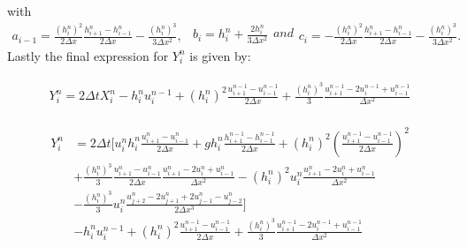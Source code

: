 \documentclass[12pt]{article}
\begin{document}
with
\begin{subequations}
	\begin{gather}
	a_{i-1} = \frac{\left(h^n_i\right)^2}{2\Delta x}\frac{h^n_{i+1} - h^n_{i-1}}{2\Delta x} - \frac{\left(h^n_i\right)^3}{3 \Delta x^2}  ,
	\label{eq:utriAa}
	\end{gather}
	\begin{gather}
	b_i = h^n_i + \frac{2 h^n_i}{3 \Delta x^2}
	\label{eq:utriAb}
	\end{gather}
	and
	\begin{gather}
	c_i = -\frac{\left(h^n_i\right)^2}{2\Delta x}\frac{h^n_{i+1} - h^n_{i-1}}{2\Delta x} - \frac{\left(h^n_i\right)^3}{3 \Delta x^2}.
	\label{eq:utriAc}
	\end{gather}
\end{subequations}
Lastly the final expression for $Y^n_i$ is given by:

	\begin{gather}
	\begin{split}
	Y^n_i = 2\Delta tX_i^{n} - h_i^{n}u_i^{n-1} + \left(h_i^{n}\right)^2\frac{u^{n-1}_{i+1} - u^{n-1}_{i-1}}{2\Delta x} + \frac{\left(h_i^{n}\right)^3}{3}\frac{u^{n-1}_{i+1} -2 u^{n-1}_{i} + u^{n-1}_{i-1}}{\Delta x^2}
	\end{split}
	\end{gather}

	\begin{gather}
	\begin{split}
	Y^n_i &= 2\Delta t \Bigg[u^n_ih^n_i \frac{u^{n}_{i+1} - u^{n}_{i-1}}{2\Delta x} + gh^n_i\frac{h^{n-1}_{i+1} - h^{n-1}_{i-1}}{2\Delta x} + \left(h^n_i\right)^2 \left(\frac{u^{n-1}_{i+1} - u^{n-1}_{i-1}}{2\Delta x} \right)^2 \\ &+ \frac{\left(h^n_i\right)^3}{3}\frac{u^{n}_{i+1} - u^{n}_{i-1}}{2\Delta x}\frac{u^{n}_{i+1} -2u^{n}_{i}   + u^{n}_{i-1}}{\Delta x^2} - \left(h^n_i\right)^2u^n_i\frac{u^{n}_{i+1} -2u^{n}_{i} + u^{n}_{i-1}}{\Delta x^2}  \\  &- \frac{\left(h^n_i\right)^3}{3}u^n_i\frac{ u^n_{j+2} - 2u^n_{j+1} + 2 u^n_{j-1} - u^n_{j-2}}{2 \Delta x^3} \Bigg] \\ &- h_i^{n}u_i^{n-1} + \left(h_i^{n}\right)^2\frac{u^{n-1}_{i+1} - u^{n-1}_{i-1}}{2\Delta x} + \frac{\left(h_i^{n}\right)^3}{3}\frac{u^{n-1}_{i+1} -2 u^{n-1}_{i} + u^{n-1}_{i-1}}{\Delta x^2}
	\end{split}
	\end{gather}

\end{document}
